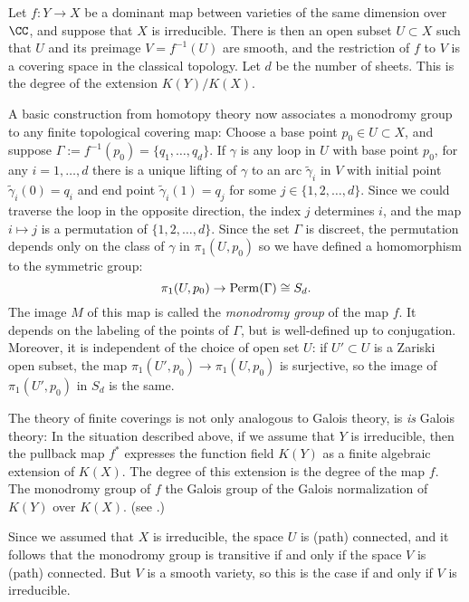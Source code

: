 Let $f : Y \to X$ be a dominant map between varieties of the same dimension over $\CC$, and suppose that $X$ is irreducible. There is then an open subset $U \subset X$ such that $U$ and 
its preimage $V = f^{-1}(U)$ are smooth, and the restriction of $f$ to $V$ is a covering space in the classical topology. Let $d$ be the number of sheets. This is the degree of the extension $K(Y)/K(X)$.

A basic construction from homotopy theory now associates a monodromy group to any finite topological covering map: Choose a base point $p_0 \in U \subset X$, and suppose $\Gamma := f^{-1}(p_0)  = \{q_1,\dots,q_d\}$. If $\gamma$ is any loop in $U$ with base point $p_0$, for any $i = 1, \dots, d$ there is a unique lifting of $\gamma$ to an arc $\tilde \gamma_i$ in $V$ with initial point $\tilde \gamma_i(0) = q_i$ and end point $\tilde \gamma_i(1) = q_j$ for some $j \in \{1,2,\dots,d\}$. Since we could traverse the loop in the opposite direction, the index $j$ determines $i$, and the map $i\mapsto j$ is a permutation of $\{1,2,\dots,d\}$. 
Since the set $\Gamma$ is discreet, the permutation depends only on the class of $\gamma$ in $\pi_1(U,p_0)$ so we have defined a homomorphism to the symmetric group:
$$
\pi_1(U,p_0)  \to {\rm Perm}(\Gamma) \cong S_d.
$$
The image $M$ of this map is called the \emph{monodromy group} of the map $f$. It depends on the labeling of the points of $\Gamma$, but is well-defined  up to conjugation. Moreover, it is independent of the choice of open set $U$: if $U' \subset U$ is a Zariski open subset, the map $\pi_1(U', p_0) \to \pi_1(U,p_0)$ is surjective,  so the image of $\pi_1(U', p_0)$ in $S_d$ is the same.

\begin{fact}
The theory of finite coverings is not only analogous to Galois theory, is \emph{is} Galois theory: In the situation described above, if we assume that $Y$ is irreducible, then the pullback map $f^*$ expresses the function field $K(Y)$ as a finite algebraic extension of $K(X)$. The degree of this extension is the degree of the map $f$. The monodromy group of $f$  the Galois group of the Galois normalization of $K(Y)$ over $K(X)$. (see \cite{Harris1979}.)
\end{fact}

Since we assumed that $X$ is irreducible, the space $U$ is (path) connected, and it follows that the monodromy group is transitive if and only if the space $V$ is (path) connected. But $V$ is a smooth
variety, so this is the case if and only if $V$ is irreducible.

